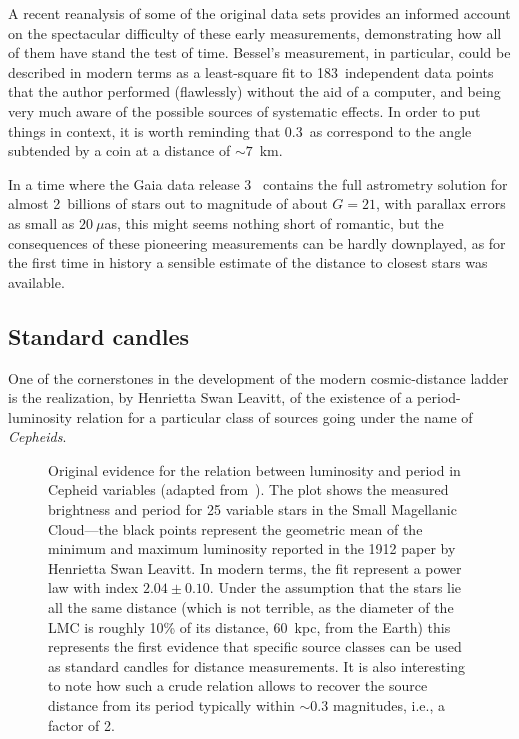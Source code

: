 A recent reanalysis \cite{2020AN....341..860R} of some of the original data sets
provides an informed account on the spectacular difficulty of these early measurements,
demonstrating how all of them have stand the test of time. Bessel's measurement,
in particular, could be described in modern terms as a least-square fit to 183~independent
data points that the author performed (flawlessly) without the aid of a computer,
and being very much aware of the possible sources of systematic effects. In order
to put things in context, it is worth reminding that 0.3~as correspond to the angle
subtended by a coin at a distance of $\sim 7$~km.

In a time where the Gaia data release 3~\cite{2023A&A...674A...1G} contains the
full astrometry solution for almost 2~billions of stars out to magnitude of about
$G = 21$, with parallax errors as small as $20~\mu$as, this might seems nothing
short of romantic, but the consequences of these pioneering measurements can be
hardly downplayed, as for the first time in history a sensible estimate of the distance
to closest stars was available.



\subsection{Standard candles}
\label{dec:standard_candles}

One of the cornerstones in the development of the modern cosmic-distance ladder is
the realization, by Henrietta Swan Leavitt, of the existence of
a period-luminosity relation for a particular class of sources going under the name
of \emph{Cepheids}.

\begin{figure}[htbp!]
	
	\caption{Original evidence for the relation between luminosity and period in
    Cepheid variables (adapted from~\cite{1912HarCi.173....1L}). The plot
    shows the measured brightness and period for 25 variable stars in the Small
    Magellanic Cloud---the black points represent the geometric mean of the
    minimum and maximum luminosity reported in the 1912 paper by Henrietta Swan Leavitt.
    In modern terms, the fit represent a power law with index $2.04 \pm 0.10$.
    Under the assumption that the stars lie all the same distance (which is not
    terrible, as the diameter of the LMC is roughly 10\% of its distance, 60~kpc,
    from the Earth) this represents the first evidence that specific source classes
    can be used as standard candles for distance measurements. It is also interesting
    to note how such a crude relation allows to recover the source distance
    from its period typically within $\sim 0.3$ magnitudes, i.e., a factor of 2.}
\end{figure}

